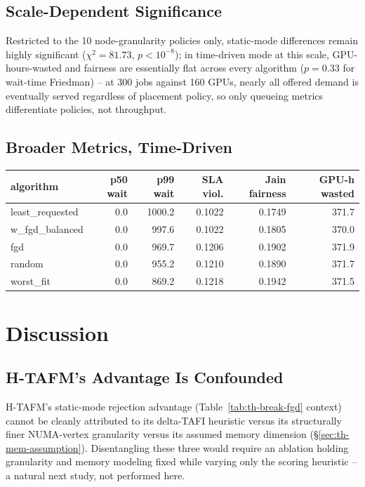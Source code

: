 \documentclass[12pt]{report}
\begin{document}
\section{Scale-Dependent Significance}
Restricted to the 10 node-granularity policies only, static-mode
differences remain highly significant ($\chi^2=81.73$, $p<10^{-8}$); in
time-driven mode at this scale, GPU-hours-wasted and fairness are
essentially flat across every algorithm ($p=0.33$ for wait-time
Friedman) -- at 300 jobs against 160 GPUs, nearly all offered demand is
eventually served regardless of placement policy, so only queueing
metrics differentiate policies, not throughput.

\section{Broader Metrics, Time-Driven}
\begin{table}[h]
\centering
\small
\begin{tabular}{lrrrrr}
\toprule
algorithm & p50 wait & p99 wait & SLA viol. & Jain fairness & GPU-h wasted \\
\midrule
least\_requested & 0.0 & 1000.2 & 0.1022 & 0.1749 & 371.7 \\
w\_fgd\_balanced & 0.0 & 997.6 & 0.1022 & 0.1805 & 370.0 \\
fgd & 0.0 & 969.7 & 0.1206 & 0.1902 & 371.9 \\
random & 0.0 & 955.2 & 0.1210 & 0.1890 & 371.7 \\
worst\_fit & 0.0 & 869.2 & 0.1218 & 0.1942 & 371.5 \\
\bottomrule
\end{tabular}
\end{table}

\chapter{Discussion}
\label{ch:discussion}

\section{H-TAFM's Advantage Is Confounded}
H-TAFM's static-mode rejection advantage (Table~\ref{tab:th-break-fgd}
context) cannot be cleanly attributed to its delta-TAFI heuristic versus
its structurally finer NUMA-vertex granularity versus its assumed memory
dimension (\S\ref{sec:th-mem-assumption}). Disentangling these three would
require an ablation holding granularity and memory modeling fixed while
varying only the scoring heuristic -- a natural next study, not performed
here.
\end{document}
